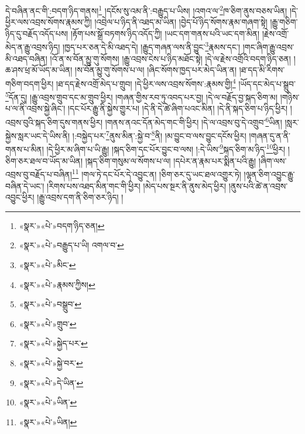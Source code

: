 དེ་བཞིན་ནང་གི་:བདག་ཉིད་གནས།\footnote{«སྣར་»«པེ་»བདག་ཉིད་ཅན།} །དངོས་སུ་འམ་ནི་:བརྒྱུད་པ་ཡིས། །འགའ་ལ་\footnote{«སྣར་»«པེ་»བརྒྱུད་པ་ཡི། འགལ་བ་}ཁ་ཅིག་ནུས་བཅས་ཡིན། །དེ་ཕྱིར་ལས་འབྲས་སོགས་རྣམས་ཀྱི། །འབྲེལ་པ་ཉིད་ནི་འཐད་མ་ཡིན། །བྱེད་པོ་ཉིད་སོགས་རྣམ་གཞག་སྟེ། །རྒྱུ་གཅིག་ཉིད་དུ་བརྗོད་འདོད་པས། །རྟོག་པས་སྒྲོ་བཏགས་ཉིད་འདོད་ཀྱི། །ཡང་དག་གནས་པའི་ཡང་དག་མིན། །རྗེས་འགྲོ་མེད་ན་རྒྱུ་འབྲས་ཉིད། །ཁྱད་པར་ཅན་དེ་མི་འཐད་དེ། །རྒྱུད་གཞན་ལས་ནི་བྱུང་\footnote{«སྣར་»«པེ་»མིང་}རྣམས་དང་། །གང་ཞིག་རྒྱུ་འབྲས་མི་འཐད་བཞིན། །འོ་ན་ས་བོན་མྱུ་གུ་སོགས། །རྒྱུ་འབྲས་ངེས་པ་ཉིད་མཐོང་སྟེ། །དེ་ལ་རྗེས་འགྲོའི་བདག་ཉིད་ཅན། །ཆ་ཤས་ཕྲ་མོ་ཡོད་མ་ཡིན། །ས་བོན་མྱུ་གུ་སོགས་པ་ལ། །ཞིང་སོགས་ཁྱད་པར་མེད་ཡིན་ན། །ཐ་དད་མི་རིགས་གཅིག་བདག་ཕྱིར། །ཐ་དད་རྗེས་འགྲོ་མེད་པ་གྲུབ། །དེ་ཕྱིར་ལས་འབྲས་སོགས་:རྣམས་གྱི།\footnote{«སྣར་»«པེ་»རྣམས་ཀྱིས།} །ཡོད་དང་མེད་པ་སྒྲུབ་\footnote{«སྣར་»«པེ་»བསྒྲུབ་}དོན་དུ། །རྒྱུ་འབྲས་གྲུབ་དང་མ་གྲུབ་ཕྱིར། །གཞན་གྱིས་རབ་ཏུ་འབད་པར་བྱ། །དེ་ལ་བརྗོད་བྱ་སྐད་ཅིག་མ། །གཉིས་པ་ལ་ནི་འབྲས་སྐྱེ་ཞིང་། །དང་པོར་རྒྱུ་ནི་སྐྱེས་གྱུར་པ། །དེ་ནི་དེ་ཚེ་ཞིག་པའང་མིན། །དེ་ནི་སྐད་ཅིག་པ་ཉིད་ཕྱིར། །འབྲས་བུའི་སྐད་ཅིག་དུས་གནས་ཕྱིར། །གནས་ནའང་དོན་མེད་གང་གི་ཕྱིར། །དེ་ལ་འབྲས་བུ་དེ་འགྲུབ་\footnote{«སྣར་»«པེ་»གྲུབ་}ཡིན། །སླར་སྐྱེས་སླར་ཡང་དེ་ཡིས་ནི། །:བསྐྱེད་པར་\footnote{«སྣར་»«པེ་»སྐྱེད་པར་}ནུས་མིན་:སྐྱེ་བ་\footnote{«སྣར་»«པེ་»སྐྱེ་བར་}ནི། །མ་བྱུང་བ་ལས་བྱུང་དངོས་ཕྱིར། །གཞན་དུ་ན་ནི་གནས་པ་མིན། །དེ་ཕྱིར་མ་ཞིག་པ་ཡི་རྒྱུ། །སྐད་ཅིག་དང་པོར་བྱུང་བ་ལས། །:དེ་ཡིས་\footnote{«སྣར་»«པེ་»དེ་ཡིན་}སྐད་ཅིག་མ་ཉིད་\footnote{«སྣར་»«པེ་»ཡིན་}ཕྱིར། །ཅིག་ཅར་ཐལ་བ་ཡོད་མ་ཡིན། །སྐད་ཅིག་གསུམ་ལ་སོགས་པ་ལ། །དཔེར་ན་རྣམ་པར་སྨིན་པའི་རྒྱུ། །ཞིག་ལས་འབྲས་བུ་བརྗོད་པ་བཞིན།\footnote{«སྣར་»«པེ་»ཡིན།} །གལ་ཏེ་དང་པོར་དེ་འབྱུང་ན། །ཅིག་ཅར་དུ་ཡང་ཐལ་འགྱུར་ཏེ། །ལྷན་ཅིག་འབྱུང་རྒྱུ་བཞིན་དེ་ཡང་། །རིགས་པས་འཐད་མིན་གང་གི་ཕྱིར། །མེད་པས་སྔར་ནི་ནུས་མེད་ཕྱིར། །ནུས་པའི་ཚེ་ན་འབྲས་འབྱུང་ཕྱིར། །རྒྱུ་འབྲས་དག་ནི་ཅིག་ཅར་ཉིད། །

